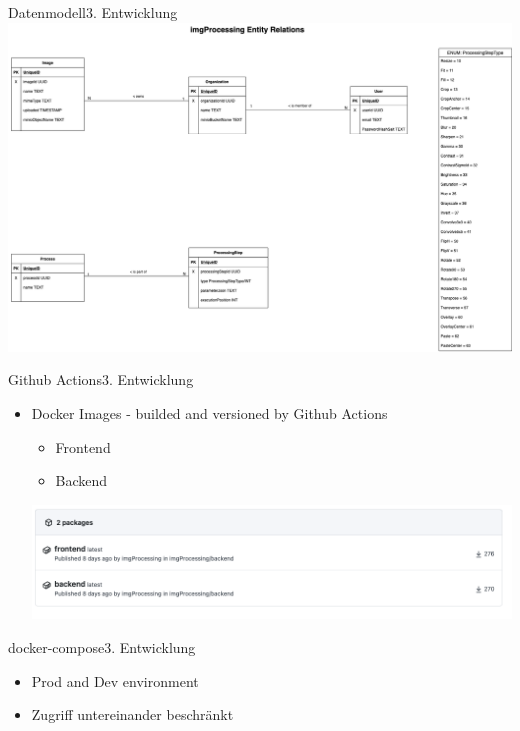 \documentclass[aspectratio=169,20pt]{beamer}
\begin{document}
\begin{frame}{Datenmodell}{3. Entwicklung}
	\includegraphics[scale=0.40]{db_model}	
\end{frame}

\begin{frame}{Github Actions}{3. Entwicklung}
	\begin{itemize}
		\item{Docker Images - builded and versioned by Github Actions}
		\begin{itemize}
			\item{Frontend}
			\item{Backend}
		\end{itemize}
		\includegraphics[scale=0.8]{action}
	\end{itemize}
\end{frame}

\begin{frame}{docker-compose}{3. Entwicklung}
	\begin{itemize}
		\item{Prod and Dev environment}
		\item{Zugriff untereinander beschränkt}
	\end{itemize}
\end{frame}
\end{document}

